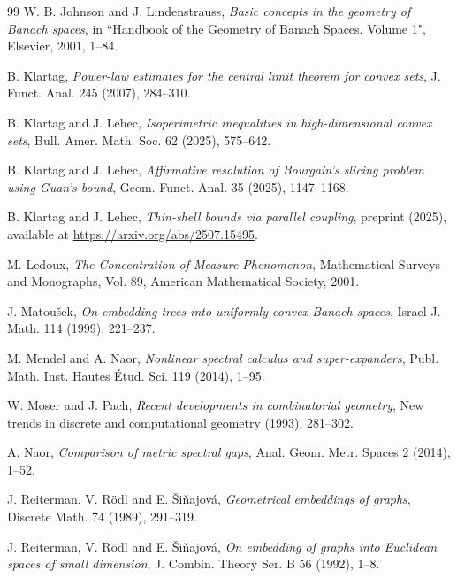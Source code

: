 \documentclass[11pt,leqno]{amsart}
\theoremstyle{remark}
\theoremstyle{plain}
\begin{document}
\begin{thebibliography}{99}
W. B. Johnson and J. Lindenstrauss,
\emph{Basic concepts in the geometry of Banach spaces},
in ``Handbook of the Geometry of Banach Spaces. Volume 1"\!, Elsevier, 2001, 1--84.

B. Klartag,
\emph{Power-law estimates for the central limit theorem for convex sets},
J. Funct. Anal. 245 (2007), 284--310.

B. Klartag and J. Lehec,
\emph{Isoperimetric inequalities in high-dimensional convex sets},
Bull. Amer. Math. Soc. 62 (2025), 575--642.

B. Klartag and J. Lehec,
\emph{Affirmative resolution of Bourgain's slicing problem using Guan's bound},
Geom. Funct. Anal. 35 (2025), 1147--1168.

 B. Klartag and J. Lehec,
\emph{Thin-shell bounds via parallel coupling},
preprint (2025), available at \url{https://arxiv.org/abs/2507.15495}.

M. Ledoux,
\emph{The Concentration of Measure Phenomenon},
Mathematical Surveys and Monographs, Vol. 89, American Mathematical Society, 2001.

J. Matou\v{s}ek,
\emph{On embedding trees into uniformly convex Banach spaces},
Israel J. Math. 114 (1999), 221--237.

M. Mendel and A. Naor,
\emph{Nonlinear spectral calculus and super-expanders},
Publ. Math. Inst. Hautes \'{E}tud. Sci. 119 (2014), 1--95.

W. Moser and J. Pach,
\emph{Recent developments in combinatorial geometry},
New trends in discrete and computational geometry (1993), 281--302.

A. Naor,
\emph{Comparison of metric spectral gaps},
Anal. Geom. Metr. Spaces 2 (2014), 1--52.

J. Reiterman, V. R\"{o}dl and E. \v{S}i\v{n}ajov\'{a},
\emph{Geometrical embeddings of graphs},
Discrete Math. 74 (1989), 291--319.

J. Reiterman, V. R\"{o}dl and  E. \v{S}i\v{n}ajov\'{a},
\emph{On embedding of graphs into Euclidean spaces of small dimension},
J. Combin. Theory Ser. B 56 (1992), 1--8.

\end{thebibliography}
\end{document}
